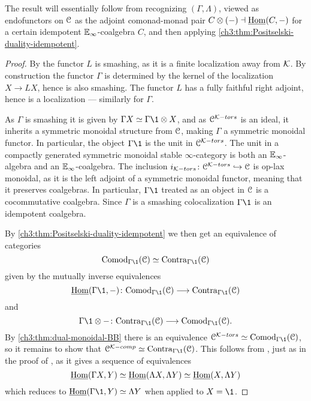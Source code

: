 \begin{remark}
    The result will essentially follow from recognizing $(\Gamma, \Lambda)$, viewed as endofunctors on $\EuScript{C}$ as the adjoint comonad-monad pair $C\otimes (-)\dashv \operatorname{\underline{Hom}}(C,-)$ for a certain idempotent $\mathbb{E}_\infty$-coalgebra $C$, and then applying \cref{ch3:thm:Positselski-duality-idempotent}. 
\end{remark}

\begin{proof}
    By \cite[3.3.3]{hovey-palmiery-strickland_97} the functor $L$ is smashing, as it is a finite localization away from $\mathcal{K}$. By construction the functor $\Gamma$ is determined by the kernel of the localization $X\to LX$, hence is also smashing. The functor $L$ has a fully faithful right adjoint, hence is a localization --- similarly for $\Gamma$. 

    As $\Gamma$ is smashing it is given by $\Gamma X \simeq \Gamma \1 \otimes X$, and as $\EuScript{C}^{\mathcal{K}-tors}$ is an ideal, it inherits a symmetric monoidal structure from $\EuScript{C}$, making $\Gamma$ a symmetric monoidal functor. In particular, the object $\Gamma \1$ is the unit in $\EuScript{C}^{\mathcal{K}-tors}$. The unit in a compactly generated symmetric monoidal stable $\infty$-category is both an $\mathbb{E}_\infty$-algebra and an $\mathbb{E}_\infty$-coalgebra. The inclusion $i_{\mathcal{K}-tors}\colon \EuScript{C}^{\mathcal{K}-tors}\hookrightarrow \EuScript{C}$ is op-lax monoidal, as it is the left adjoint of a symmetric monoidal functor, meaning that it preserves coalgebras. In particular, $\Gamma\1$ treated as an object in $\EuScript{C}$ is a cocommutative coalgebra. Since $\Gamma$ is a smashing colocalization $\Gamma \1$ is an idempotent coalgebra. 

    By \cref{ch3:thm:Positselski-duality-idempotent} we then get an equivalence of categories 
    \[\Comod_{\Gamma \1}(\C) \simeq \Contra_{\Gamma \1}(\C)\]
    given by the mutually inverse equivalences 
    \[\iHom(\Gamma \1,-)\: \Comod_{\Gamma\1}(\C) \to \Contra_{\Gamma \1}(\C)\] 
    and 
    \[\Gamma \1\otimes -\: \Contra_{\Gamma\1}(\C) \to \Comod_{\Gamma \1}(\C).\]
    By \cref{ch3:thm:dual-monoidal-BB} there is an equivalence $\C^{\K-tors}\simeq \Comod_{\Gamma\1}(\C)$, so it remains to show that $\C^{\K-comp}\simeq \Contra_{\Gamma \1}(\C)$. This follows from \cite[2.2]{barthel-heard-valenzuela_2018}, just as in the proof of \cite[2.21(4)]{barthel-heard-valenzuela_2018}, as it gives a sequence of equivalences 
    \[\operatorname{\underline{Hom}}(\Gamma X, Y) \simeq \operatorname{\underline{Hom}}(\Lambda X, \Lambda Y)\simeq \operatorname{\underline{Hom}}(X, \Lambda Y)\]
    which reduces to $\iHom(\Gamma \1, Y) \simeq \Lambda Y$ when applied to $X=\1$. 
\end{proof}

